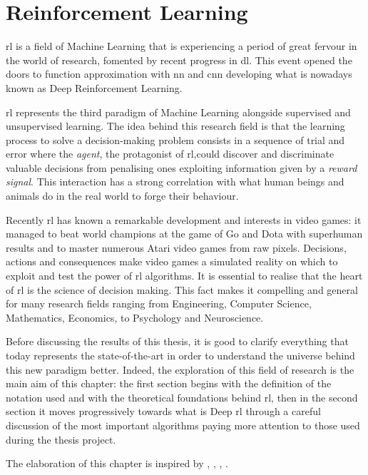 
\chapter{Reinforcement Learning}

\acrfull{rl} is a field of Machine Learning that is experiencing a period of great fervour in the world of research, fomented by recent progress in \acrfull{dl}. This event opened the doors to function approximation with \acrfull{nn} and \acrfull{cnn} developing what is nowadays known as Deep Reinforcement Learning.

\acrshort{rl} represents the third paradigm of Machine Learning alongside supervised and unsupervised learning. The idea behind  this research field is that the learning process to solve a decision-making problem consists in a sequence of trial and error where the \textit{agent}, the protagonist of \acrshort{rl},could discover and discriminate valuable decisions from penalising ones exploiting information given by a \textit{reward signal}. This interaction has a strong correlation with what human beings and animals do in the real world to forge their behaviour.

Recently \acrshort{rl} has known a remarkable development and interests in video games: it managed to beat world champions at the game of Go \cite{silver2016mastering} and Dota with superhuman results and to master numerous Atari video games \cite{mnih2013playing} from raw pixels. Decisions, actions and consequences make video games a simulated reality on which to exploit and test the power of \acrshort{rl} algorithms.
It is essential to realise that the heart of \acrshort{rl} is the science of decision making. This fact makes it compelling and general for many research fields ranging from Engineering, Computer Science, Mathematics, Economics, to Psychology and Neuroscience.

Before discussing the results of this thesis, it is good to clarify everything that today represents the state-of-the-art in order to understand the universe behind this new paradigm better. Indeed, the exploration of this field of research is the main aim of this chapter: the first section begins with the definition of the notation used and with the theoretical foundations behind \acrshort{rl}, then in the second section it moves  progressively towards what is Deep \acrshort{rl} through a careful discussion of the most important algorithms paying more attention to those used during the thesis project.

The elaboration of this chapter is inspired by \cite{silver2015lectures}, \cite{sutton2018reinforcement}, \cite{openai2018spinningup}, \cite{lapan2018deep}.

